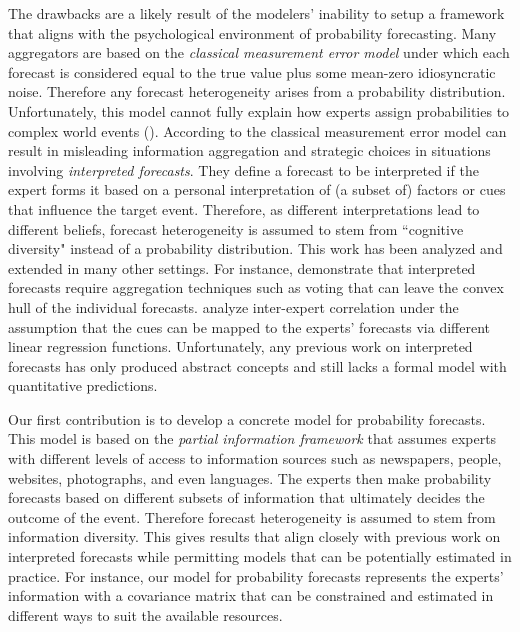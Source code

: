 \documentclass[11pt]{article}
\theoremstyle{definition}
\theoremstyle{definition}
\begin{document}
The drawbacks are a likely result of the modelers' inability to setup a framework that aligns with the psychological environment of probability forecasting. Many aggregators are based on the \textit{classical measurement error model} under which each forecast is considered equal to the true value plus some mean-zero idiosyncratic noise. Therefore any forecast heterogeneity arises from a probability distribution. Unfortunately, this model cannot fully explain how experts assign probabilities to complex world events (\cite{parunak2013exploiting}). According to \cite{hong2009interpreted} the classical measurement error model can result in misleading information aggregation and strategic choices in situations involving \textit{interpreted forecasts}. They define a forecast to be interpreted if the expert forms it based on a personal interpretation of (a subset of) factors or cues that influence the target event. Therefore, as different interpretations lead to different beliefs, forecast heterogeneity is assumed to stem from ``cognitive diversity" instead of a probability distribution. This work has been analyzed and extended in many other settings. For instance, \cite{parunak2013characterizing} demonstrate that interpreted forecasts require aggregation techniques such as voting that can leave the convex hull of the individual forecasts. \cite{broomell2009experts} analyze inter-expert correlation under the assumption that the cues can be mapped to the experts' forecasts via different linear regression functions. Unfortunately, any previous work on interpreted forecasts has only produced abstract concepts and still lacks a formal model with quantitative predictions. 


Our first contribution is to develop a concrete model for probability forecasts. This model is based on the \textit{partial information framework} that assumes experts with different levels of access to information sources such as newspapers, people, websites, photographs, and even languages. The experts  then make probability forecasts based on different subsets of information that ultimately decides the outcome of the event. Therefore forecast heterogeneity is assumed to stem from information diversity. This gives results that align closely with previous work on interpreted forecasts while permitting models that can be potentially estimated in practice. For instance, our model for probability forecasts represents  the experts' information with a covariance matrix that can be constrained and estimated in different ways to suit the available resources. 
\end{document}
